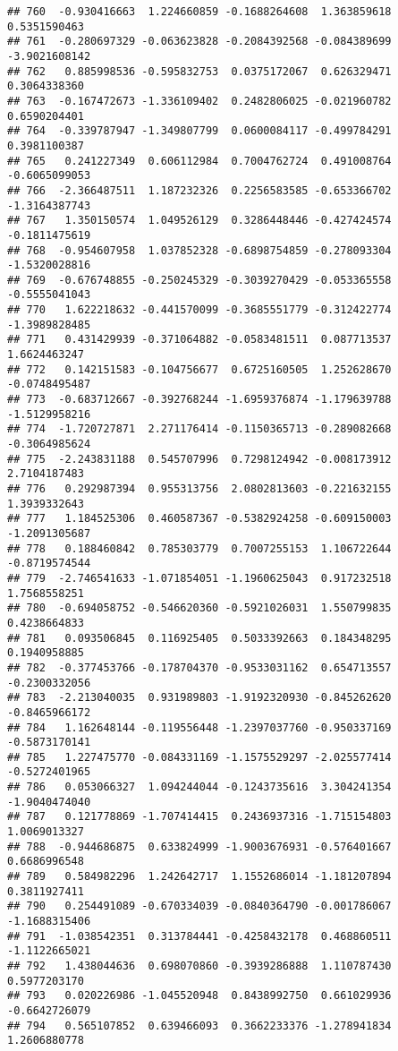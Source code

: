 \documentclass[
]{article}
\begin{document}
\begin{verbatim}
## 760  -0.930416663  1.224660859 -0.1688264608  1.363859618  0.5351590463
## 761  -0.280697329 -0.063623828 -0.2084392568 -0.084389699 -3.9021608142
## 762   0.885998536 -0.595832753  0.0375172067  0.626329471  0.3064338360
## 763  -0.167472673 -1.336109402  0.2482806025 -0.021960782  0.6590204401
## 764  -0.339787947 -1.349807799  0.0600084117 -0.499784291  0.3981100387
## 765   0.241227349  0.606112984  0.7004762724  0.491008764 -0.6065099053
## 766  -2.366487511  1.187232326  0.2256583585 -0.653366702 -1.3164387743
## 767   1.350150574  1.049526129  0.3286448446 -0.427424574 -0.1811475619
## 768  -0.954607958  1.037852328 -0.6898754859 -0.278093304 -1.5320028816
## 769  -0.676748855 -0.250245329 -0.3039270429 -0.053365558 -0.5555041043
## 770   1.622218632 -0.441570099 -0.3685551779 -0.312422774 -1.3989828485
## 771   0.431429939 -0.371064882 -0.0583481511  0.087713537  1.6624463247
## 772   0.142151583 -0.104756677  0.6725160505  1.252628670 -0.0748495487
## 773  -0.683712667 -0.392768244 -1.6959376874 -1.179639788 -1.5129958216
## 774  -1.720727871  2.271176414 -0.1150365713 -0.289082668 -0.3064985624
## 775  -2.243831188  0.545707996  0.7298124942 -0.008173912  2.7104187483
## 776   0.292987394  0.955313756  2.0802813603 -0.221632155  1.3939332643
## 777   1.184525306  0.460587367 -0.5382924258 -0.609150003 -1.2091305687
## 778   0.188460842  0.785303779  0.7007255153  1.106722644 -0.8719574544
## 779  -2.746541633 -1.071854051 -1.1960625043  0.917232518  1.7568558251
## 780  -0.694058752 -0.546620360 -0.5921026031  1.550799835  0.4238664833
## 781   0.093506845  0.116925405  0.5033392663  0.184348295  0.1940958885
## 782  -0.377453766 -0.178704370 -0.9533031162  0.654713557 -0.2300332056
## 783  -2.213040035  0.931989803 -1.9192320930 -0.845262620 -0.8465966172
## 784   1.162648144 -0.119556448 -1.2397037760 -0.950337169 -0.5873170141
## 785   1.227475770 -0.084331169 -1.1575529297 -2.025577414 -0.5272401965
## 786   0.053066327  1.094244044 -0.1243735616  3.304241354 -1.9040474040
## 787   0.121778869 -1.707414415  0.2436937316 -1.715154803  1.0069013327
## 788  -0.944686875  0.633824999 -1.9003676931 -0.576401667  0.6686996548
## 789   0.584982296  1.242642717  1.1552686014 -1.181207894  0.3811927411
## 790   0.254491089 -0.670334039 -0.0840364790 -0.001786067 -1.1688315406
## 791  -1.038542351  0.313784441 -0.4258432178  0.468860511 -1.1122665021
## 792   1.438044636  0.698070860 -0.3939286888  1.110787430  0.5977203170
## 793   0.020226986 -1.045520948  0.8438992750  0.661029936 -0.6642726079
## 794   0.565107852  0.639466093  0.3662233376 -1.278941834  1.2606880778

\end{verbatim}
\end{document}
